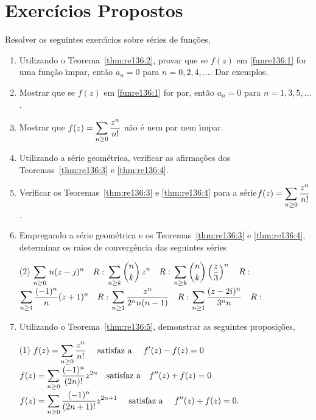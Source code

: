 \section*{Exercícios Propostos} 
Resolver os seguintes exerc\'{\i}cios sobre s\'{e}ries de fun\c{c}\~{o}es,
\begin{enumerate}[label=\rm{(\arabic*)},ref=\rm{(\arabic*)}]
\item Utilizando o Teorema~\ref{thm:re136:2}, provar que se $f(z)$ em \eqref{funre136:1} for uma
fun\c{c}\~{a}o \'{\i}mpar, ent\~{a}o $a_n =0$ para $n=0,2,4,\ldots$. Dar exemplos.
\item Mostrar que se $f(z)$ em \eqref{funre136:1} for par, ent\~{a}o $a_n = 0$ para $n = 1,
3, 5,\ldots$.
\item Mostrar que $\displaystyle{f(z)=\sum_{n\geq 0}\frac{z^n}{n!}}$ n\~{a}o \'{e} nem par nem \'{\i}mpar.
\item  Utilizando a s\'{e}rie geom\'{e}trica, verificar as afirma\c{c}\~{o}es dos Teoremas~\ref{thm:re136:3}
e \ref{thm:re136:4}.
\item Verificar os Teoremas~\ref{thm:re136:3} e \ref{thm:re136:4} para a
s\'{e}rie$\displaystyle{f(z)=\sum_{n\geq 0}\frac{z^n}{n!}}$.
\item Empregando a s\'{e}rie geom\'{e}trica e os Teoremas~\ref{thm:re136:3} e \ref{thm:re136:4}, determinar os
raios de converg\^{e}ncia das seguintes s\'{e}ries
\begin{tasks}[label=\rm{(\alph*)},item-indent=4em,label-width=4ex,ref=\rm{(\alph*)}](2)
\task  \(\displaystyle \sum_{n\geq 0}\,n(z-j)^{n}\quad   R: \)
\task  \(\displaystyle \sum_{n\geq k}{n\choose k}\,z^{n}\quad  R:\)
\task  \(\displaystyle \sum_{n\geq k}{n\choose k}\left(\dfrac{z}{3}\right)^{n}\quad  R: \)
\task  \(\displaystyle \sum_{n\geq 1}\frac{(-1)^n}{n}(z+1)^{n}\quad  R:\)
\task  \(\displaystyle \sum_{n\geq 1}\frac{z^n}{2^n n(n-1)}\quad  R: \)
\task  \(\displaystyle \sum_{n\geq 1}\frac{(z-2i)^n}{3^n n}\quad  R:\)
\end{tasks}
\item Utilizando o Teorema~\ref{thm:re136:5}, demonstrar as seguintes proposi\c{c}\~{o}es,
\begin{tasks}[label=\rm{(\alph*)},item-indent=4em,label-width=4ex,ref=\rm{(\alph*)}](1)
\task \(\displaystyle{f(z)=\sum_{n\geq 0}\frac{z^n}{n!}}\quad \textrm{ satisfaz a }\quad  f'(z)-f(z)=0\)
\task \(\displaystyle{f(z)=\sum_{n\geq 0}\frac{(-1)^n}{(2n)!}z^{2n}} \quad \textrm{satisfaz a} \quad  f''(z)+f(z)=0\)
\task \(\displaystyle{f(z)=\sum_{n\geq 0}\frac{(-1)^n}{(2n+1)!}z^{2n+1}}\quad  \textrm{ satisfaz a } \quad  f''(z)+f(z)=0.\)
\end{tasks}
\end{enumerate}

